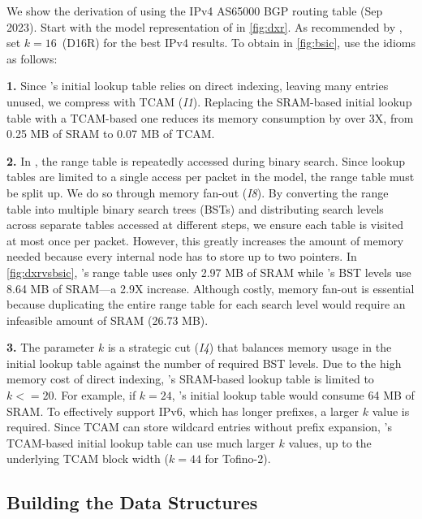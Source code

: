 We show the \cram derivation of \bsic using the IPv4 AS65000 BGP routing table (Sep 2023). Start with the \cram model representation of \dxr in \cref{fig:dxr}. As recommended by \cite{dxr}, set $k=16$~(D16R) for the best IPv4 results. To obtain \bsic in \cref{fig:bsic}, use the idioms as follows:

{\bf 1.} Since \dxr's initial lookup table relies on direct indexing, leaving many entries unused, we compress with TCAM ({\em I1}). Replacing the SRAM-based initial lookup table with a TCAM-based one reduces its memory consumption by over 3X, from 0.25 MB of SRAM to 0.07 MB of TCAM.

{\bf 2.} In \dxr, the range table is repeatedly accessed during binary search. Since lookup tables are limited to a single access per packet in the \cram model, the range table must be split up. We do so through memory fan-out ({\em I8}). By converting the range table into multiple binary search trees (BSTs) and distributing search levels across separate tables accessed at different steps, we ensure each table is visited at most once per packet. However, this greatly increases the amount of memory needed because every internal node has to store up to two pointers. In \cref{fig:dxrvsbsic}, \dxr's range table uses only 2.97 MB of SRAM while \bsic's BST levels use 8.64 MB of SRAM---a 2.9X increase. Although costly, memory fan-out is essential because duplicating the entire range table for each search level would require an infeasible amount of SRAM (26.73 MB).

{\bf 3.} The parameter $k$ is a strategic cut ({\em I4}) that balances memory usage in the initial lookup table against the number of required BST levels. Due to the high memory cost of direct indexing, \dxr's SRAM-based lookup table is limited to $k<=20$. For example, if $k=24$, \dxr's initial lookup table would consume 64 MB of SRAM. To effectively support IPv6, which has longer prefixes, a larger $k$ value is required. Since TCAM can store wildcard entries without prefix expansion, \bsic's TCAM-based initial lookup table can use much larger $k$ values, up to the underlying TCAM block width ($k=44$ for Tofino-2).

\subsection{Building the Data Structures} \label{subsec:building_bsic}

